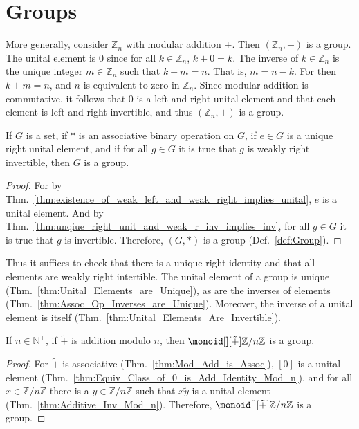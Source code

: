 \section{Groups}

    \begin{example}
        More generally, consider $\mathbb{Z}_{n}$ with modular addition $+$.
        Then $(\mathbb{Z}_{n},+)$ is a group. The unital element is $0$ since
        for all $k\in\mathbb{Z}_{n}$, $k+0=k$. The inverse of
        $k\in\mathbb{Z}_{n}$ is the unique integer $m\in\mathbb{Z}_{n}$ such
        that $k+m=n$. That is, $m=n-k$. For then $k+m=n$, and $n$ is equivalent
        to zero in $\mathbb{Z}_{n}$. Since modular addition is commutative, it
        follows that $0$ is a left and right unital element and that each
        element is left and right invertible, and thus $(\mathbb{Z}_{n},+)$ is a
        group.
    \end{example}
    \begin{theorem}
        If $G$ is a set, if $*$ is an associative binary operation on $G$, if
        $e\in{G}$ is a unique right unital element, and if for all $g\in{G}$ it
        is true that $g$ is weakly right invertible, then $G$ is a group.
    \end{theorem}
    \begin{proof}
        For by
        Thm.~\ref{thm:existence_of_weak_left_and_weak_right_implies_unital},
        $e$ is a unital element. And by
        Thm.~\ref{thm:unqiue_right_unit_and_weak_r_inv_implies_inv}, for all
        $g\in{G}$ it is true that $g$ is invertible. Therefore, $(G,*)$ is a
        group (Def.~\ref{def:Group}).
    \end{proof}
    Thus it suffices to check that there is a unique right identity and that all
    elements are weakly right intertible. The unital element of a group is
    unique (Thm.~\ref{thm:Unital_Elements_are_Unique}), as are the inverses of
    elements (Thm.~\ref{thm:Assoc_Op_Inverses_are_Unique}). Moreover, the
    inverse of a unital element is itself
    (Thm.~\ref{thm:Unital_Elements_Are_Invertible}).
    \begin{theorem}
        If $n\in\mathbb{N}^{+}$, if $\tilde{+}$ is addition modulo $n$,
        then $\monoid[][\tilde{+}]{\mathbb{Z}/n\mathbb{Z}}$ is a group.
    \end{theorem}
    \begin{proof}
        For $\tilde{+}$ is associative (Thm.~\ref{thm:Mod_Add_is_Assoc}),
        $[0]$ is a unital element
        (Thm.~\ref{thm:Equiv_Class_of_0_is_Add_Identity_Mod_n}), and
        for all $x\in\mathbb{Z}/n\mathbb{Z}$ there is a
        $y\in\mathbb{Z}/n\mathbb{Z}$ such that $x\tilde{y}$ is a unital
        element (Thm.~\ref{thm:Additive_Inv_Mod_n}). Therefore,
        $\monoid[][\tilde{+}]{\mathbb{Z}/n\mathbb{Z}}$ is a group.
    \end{proof}
